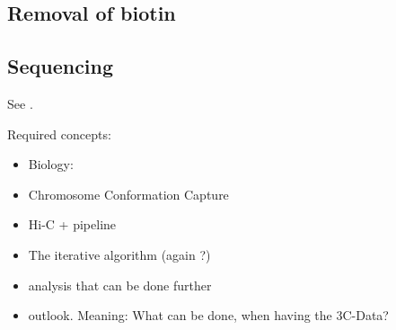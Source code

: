 \subsection{Removal of biotin}


\subsection{Sequencing}




%
%
%
%
%
%

See .



Required concepts:
\begin{itemize}
    \item Biology:
    \item Chromosome Conformation Capture
    \item Hi-C  + pipeline
    \item The iterative algorithm (again ?)
    \item analysis that can be done further
    \item outlook. Meaning: What can be done, when having the 3C-Data?
\end{itemize}





